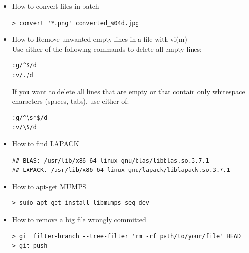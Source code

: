 \begin{itemize}
\item How to convert files in batch 

\begin{mdframed}[backgroundcolor=gray!10]
\begin{verbatim}
> convert '*.png' converted_%04d.jpg
\end{verbatim}
\end{mdframed}

\item How to Remove unwanted empty lines in a file with vi(m)\\
Use either of the following commands to delete all empty lines: 
\begin{mdframed}[backgroundcolor=gray!10]
\begin{verbatim}
:g/^$/d
:v/./d
\end{verbatim}
\end{mdframed}
If you want to delete all lines that are empty or that contain only whitespace 
characters (spaces, tabs), use either of: 
\begin{mdframed}[backgroundcolor=gray!10]
\begin{verbatim}
:g/^\s*$/d
:v/\S/d
\end{verbatim}
\end{mdframed}

\item How to find LAPACK
\begin{mdframed}[backgroundcolor=gray!10]
\begin{verbatim}
## BLAS: /usr/lib/x86_64-linux-gnu/blas/libblas.so.3.7.1
## LAPACK: /usr/lib/x86_64-linux-gnu/lapack/liblapack.so.3.7.1
\end{verbatim}
\end{mdframed}

\item How to apt-get MUMPS

\begin{mdframed}[backgroundcolor=gray!10]
\begin{verbatim}
> sudo apt-get install libmumps-seq-dev
\end{verbatim}
\end{mdframed}

\item How to remove a big file wrongly committed

\begin{mdframed}[backgroundcolor=gray!10]
\begin{verbatim}
> git filter-branch --tree-filter 'rm -rf path/to/your/file' HEAD
> git push
\end{verbatim}
\end{mdframed}


\end{itemize}
